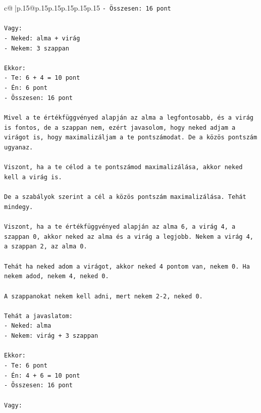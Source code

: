 \documentclass{article}
\begin{document}
{\begin{supertabular}{c@{$\;$}|p{.15\linewidth}@{}p{.15\linewidth}p{.15\linewidth}p{.15\linewidth}p{.15\linewidth}p{.15\linewidth}}
{{{\texttt{{-} Összesen: 16 pont} \\
\\ 
\texttt{Vagy:} \\
\texttt{{-} Neked: alma + virág} \\
\texttt{{-} Nekem: 3 szappan} \\
\\ 
\texttt{Ekkor:} \\
\texttt{{-} Te: 6 + 4 = 10 pont} \\
\texttt{{-} Én: 6 pont} \\
\texttt{{-} Összesen: 16 pont} \\
\\ 
\texttt{Mivel a te értékfüggvényed alapján az alma a legfontosabb, és a virág is fontos, de a szappan nem, ezért javasolom, hogy neked adjam a virágot is, hogy maximalizáljam a te pontszámodat. De a közös pontszám ugyanaz.} \\
\\ 
\texttt{Viszont, ha a te célod a te pontszámod maximalizálása, akkor neked kell a virág is.} \\
\\ 
\texttt{De a szabályok szerint a cél a közös pontszám maximalizálása. Tehát mindegy.} \\
\\ 
\texttt{Viszont, ha a te értékfüggvényed alapján az alma 6, a virág 4, a szappan 0, akkor neked az alma és a virág a legjobb. Nekem a virág 4, a szappan 2, az alma 0.} \\
\\ 
\texttt{Tehát ha neked adom a virágot, akkor neked 4 pontom van, nekem 0. Ha nekem adod, nekem 4, neked 0.} \\
\\ 
\texttt{A szappanokat nekem kell adni, mert nekem 2{-}2, neked 0.} \\
\\ 
\texttt{Tehát a javaslatom:} \\
\texttt{{-} Neked: alma} \\
\texttt{{-} Nekem: virág + 3 szappan} \\
\\ 
\texttt{Ekkor:} \\
\texttt{{-} Te: 6 pont} \\
\texttt{{-} Én: 4 + 6 = 10 pont} \\
\texttt{{-} Összesen: 16 pont} \\
\\ 
\texttt{Vagy:} \\
}}}
\end{supertabular}}
\end{document}
